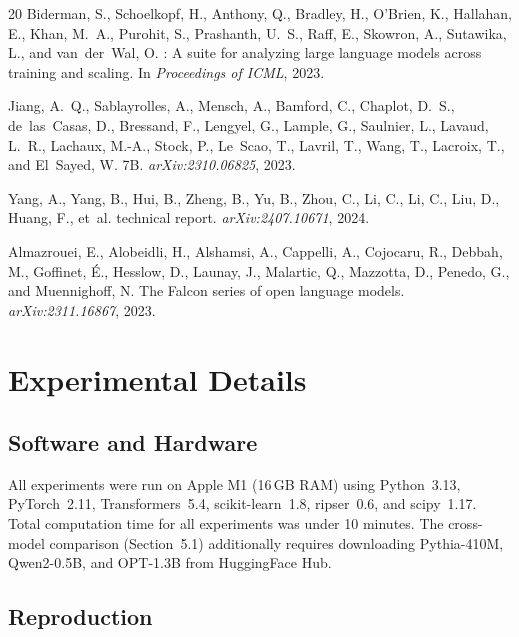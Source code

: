 \documentclass[11pt,a4paper]{article}
\begin{document}
\begin{thebibliography}{20}
Biderman, S., Schoelkopf, H., Anthony, Q., Bradley, H., O'Brien, K., Hallahan, E., Khan, M.~A., Purohit, S., Prashanth, U.~S., Raff, E., Skowron, A., Sutawika, L., and van~der~Wal, O.
: A suite for analyzing large language models across training and scaling.
\newblock In \emph{Proceedings of ICML}, 2023.

Jiang, A.~Q., Sablayrolles, A., Mensch, A., Bamford, C., Chaplot, D.~S., de~las~Casas, D., Bressand, F., Lengyel, G., Lample, G., Saulnier, L., Lavaud, L.~R., Lachaux, M.-A., Stock, P., Le~Scao, T., Lavril, T., Wang, T., Lacroix, T., and El~Sayed, W.
 7{B}.
\newblock \emph{arXiv:2310.06825}, 2023.

Yang, A., Yang, B., Hui, B., Zheng, B., Yu, B., Zhou, C., Li, C., Li, C., Liu, D., Huang, F., et~al.
 technical report.
\newblock \emph{arXiv:2407.10671}, 2024.

Almazrouei, E., Alobeidli, H., Alshamsi, A., Cappelli, A., Cojocaru, R., Debbah, M., Goffinet, \'{E}., Hesslow, D., Launay, J., Malartic, Q., Mazzotta, D., Penedo, G., and Muennighoff, N.
\newblock The {Falcon} series of open language models.
\newblock \emph{arXiv:2311.16867}, 2023.

\end{thebibliography}

\appendix
\section{Experimental Details}

\subsection{Software and Hardware}

All experiments were run on Apple M1 (16\,GB RAM) using Python~3.13, PyTorch~2.11, Transformers~5.4, scikit-learn~1.8, ripser~0.6, and scipy~1.17. Total computation time for all experiments was under 10 minutes. The cross-model comparison (Section~5.1) additionally requires downloading Pythia-410M, Qwen2-0.5B, and OPT-1.3B from HuggingFace Hub.

\subsection{Reproduction}
\end{document}
